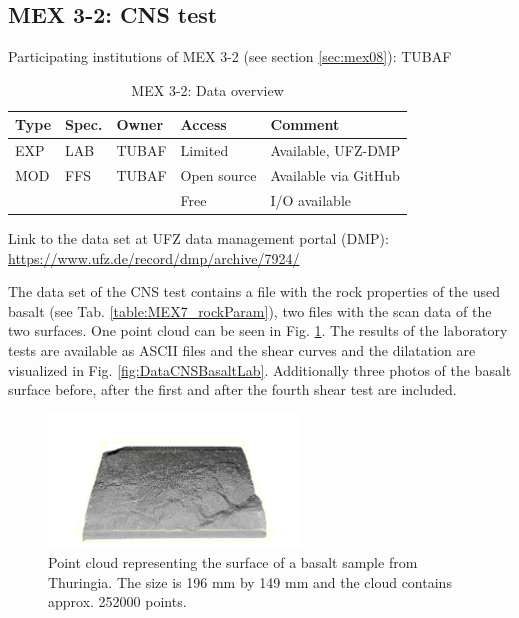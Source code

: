 \subsection{MEX 3-2: CNS test}
\label{DataManMex3-2CNS}

Participating institutions of MEX 3-2 (see section \ref{sec:mex08}): TUBAF

\begin{table}[ht!]
\caption{MEX 3-2: Data overview}
\label{tab:dms-mex32-overview}
\small
\begin{tabular}{l|l|l|l|L{4.7cm}}
\hline
{}
Type & Spec. & Owner & Access     & Comment                 \\ 
\hline 
EXP  & LAB   & TUBAF & Limited    & Available, UFZ-DMP      \\
\hline \hline
MOD  & FFS   & TUBAF & Open source & Available via GitHub   \\
     &       &       & Free       & I/O available           \\
\hline
\end{tabular}
\end{table}
\normalsize

Link to the data set at UFZ data management portal (DMP): \\ \url{https://www.ufz.de/record/dmp/archive/7924/}

The data set of the CNS test contains a file with the rock properties of the used basalt (see Tab. \ref{table:MEX7_rockParam}), two files with the scan data of the two surfaces. One point cloud can be seen in Fig. \ref{fig:DataCNSBasaltPointCloud}. The results of the laboratory tests are available as ASCII files and the shear curves and the dilatation are visualized in Fig. \ref{fig:DataCNSBasaltLab}. Additionally three photos of the basalt surface before, after the first and after the fourth shear test are included. 

\begin{figure}[!ht]
\begin{center}
\includegraphics[width=0.6\textwidth]{./figures/MEX3-2PointCloud.png}
\end{center}
\caption{Point cloud representing the surface of a basalt sample from Thuringia. The size is 196 mm by 149 mm and the cloud contains approx. 252000 points.}
\label{fig:DataCNSBasaltPointCloud}
\end{figure}

